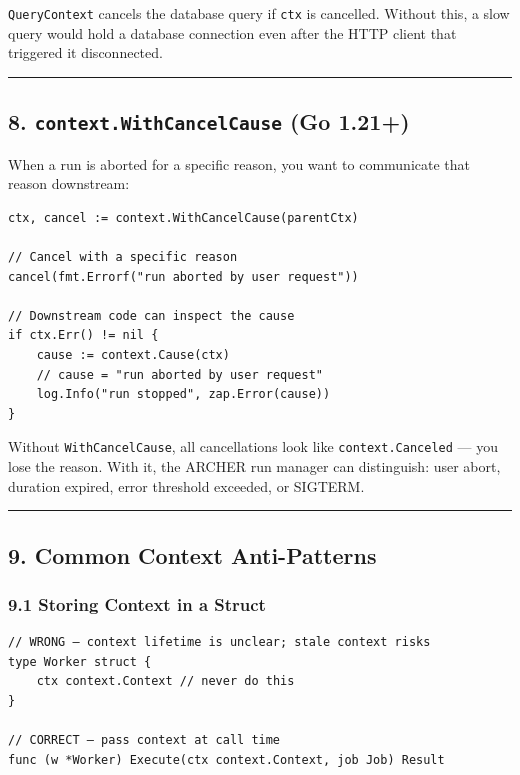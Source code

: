 \documentclass[11pt,a4paper,oneside]{book}
\begin{document}
\texttt{QueryContext} cancels the database query if \texttt{ctx} is
cancelled. Without this, a slow query would hold a database connection
even after the HTTP client that triggered it disconnected.

\begin{center}\rule{0.5\linewidth}{0.5pt}\end{center}

\subsection{\texorpdfstring{8. \texttt{context.WithCancelCause} (Go
1.21+)}{8. context.WithCancelCause (Go 1.21+)}}

When a run is aborted for a specific reason, you want to communicate
that reason downstream:

\begin{verbatim}
ctx, cancel := context.WithCancelCause(parentCtx)

// Cancel with a specific reason
cancel(fmt.Errorf("run aborted by user request"))

// Downstream code can inspect the cause
if ctx.Err() != nil {
    cause := context.Cause(ctx)
    // cause = "run aborted by user request"
    log.Info("run stopped", zap.Error(cause))
}
\end{verbatim}

Without \texttt{WithCancelCause}, all cancellations look like
\texttt{context.Canceled} --- you lose the reason. With it, the ARCHER
run manager can distinguish: user abort, duration expired, error
threshold exceeded, or SIGTERM.

\begin{center}\rule{0.5\linewidth}{0.5pt}\end{center}

\subsection{9. Common Context
Anti-Patterns}

\subsubsection{9.1 Storing Context in a
Struct}

\begin{verbatim}
// WRONG — context lifetime is unclear; stale context risks
type Worker struct {
    ctx context.Context // never do this
}

// CORRECT — pass context at call time
func (w *Worker) Execute(ctx context.Context, job Job) Result
\end{verbatim}
\end{document}
